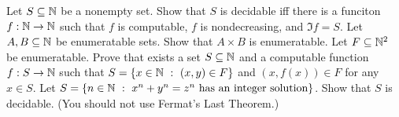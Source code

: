 \begin{chapterendexercises}
  \exercise[recommended] Let $S \subseteq \mathbb{N}$ be a nonempty set.
    Show that $S$ is decidable iff there is a funciton $f : \mathbb{N} \to \mathbb{N}$ such
    that $f$ is computable, $f$ is nondecreasing, and $\Im{f} = S$.
  \exercise Let $A, B \subseteq \mathbb{N}$ be enumeratable sets. Show that
    $A \times B$ is enumeratable.
  \exercise Let $F \subseteq \mathbb{N}^2$ be enumeratable. Prove that exists a
    set $S \subseteq \mathbb{N}$ and a computable function $f: S \to \mathbb{N}$ such that
    $S = \set[(x, y) \in F]{x \in \N}$ and $(x, f(x)) \in F$ for any $x \in S$.
  \exercise
    Let $S =
      \set[
        x^n + y^n = z^n \text{ has an integer solution}
      ]{n \in \N}$. Show that $S$ is decidable.
      (You should not use Fermat's Last Theorem.)
\end{chapterendexercises}
